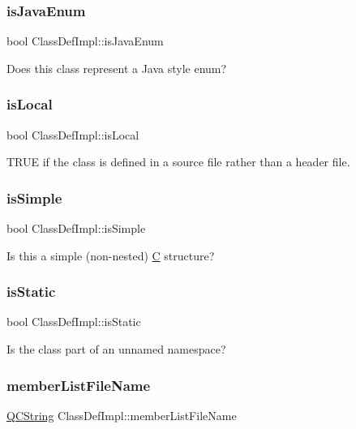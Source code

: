 \subsubsection{\texorpdfstring{isJavaEnum}{isJavaEnum}}
{\footnotesize\ttfamily bool Class\+Def\+Impl\+::is\+Java\+Enum}

Does this class represent a Java style enum? \mbox{\label{class_class_def_impl_a9a751bb93d4da92aceace3210c911aa1}} 
\subsubsection{\texorpdfstring{isLocal}{isLocal}}
{\footnotesize\ttfamily bool Class\+Def\+Impl\+::is\+Local}

T\+R\+UE if the class is defined in a source file rather than a header file. \mbox{\label{class_class_def_impl_a066ef909e009befddbd31341b9ddbb5b}} 
\subsubsection{\texorpdfstring{isSimple}{isSimple}}
{\footnotesize\ttfamily bool Class\+Def\+Impl\+::is\+Simple}

Is this a simple (non-\/nested) \mbox{\hyperlink{class_c}{C}} structure? \mbox{\label{class_class_def_impl_a13a7bfbb253abb17959c8fa78d565c51}} 
\subsubsection{\texorpdfstring{isStatic}{isStatic}}
{\footnotesize\ttfamily bool Class\+Def\+Impl\+::is\+Static}

Is the class part of an unnamed namespace? \mbox{\label{class_class_def_impl_adf2a14df16fc2bbf27a9bc928f15b7eb}} 
\subsubsection{\texorpdfstring{memberListFileName}{memberListFileName}}
{\footnotesize\ttfamily \mbox{\hyperlink{class_q_c_string}{Q\+C\+String}} Class\+Def\+Impl\+::member\+List\+File\+Name}


